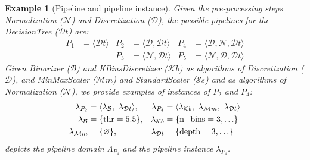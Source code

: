 \documentclass[5p,times]{elsarticle}
\newtheorem{example}{Example}
\begin{document}


\begin{example}[Pipeline and pipeline instance]
Given the pre-processing steps Normalization ($\mathcal{N}$) and Discretization ($\mathcal{D}$), the possible pipelines for the DecisionTree ($\mathcal{D}t$) are:
\begin{align*}
    P_1 &= \langle \mathcal{D}t \rangle &
    P_2 &= \langle \mathcal{D}, \mathcal{D}t \rangle & 
    P_4 &= \langle \mathcal{D}, \mathcal{N}, \mathcal{D}t \rangle \\
    &&
    P_3 &= \langle \mathcal{N}, \mathcal{D}t \rangle & P_5 &= \langle \mathcal{N}, \mathcal{D}, \mathcal{D}t \rangle
\end{align*}
Given \textup{Binarizer} ($\mathcal{B}$) and  \textup{KBinsDiscretizer} ($\mathcal{K}b$) as algorithms of Discretization ($\mathcal{D}$), and \textup{MinMaxScaler} ($\mathcal{M}m$) and \textup{StandardScaler} ($\mathcal{S}s$) and  as algorithms of Normalization ($\mathcal{N}$), we provide examples of instances of $P_2$ and $P_4$:
\begin{align*}
    \lambda_{P_2} &= \langle \lambda_{\mathcal{B}},~ \lambda_{\mathcal{D}t} \rangle, &\lambda_{P_4} &= \langle \lambda_{\mathcal{K}b},~ \lambda_{\mathcal{M}m},~ \lambda_{\mathcal{D}t} \rangle \\
    \lambda_{\mathcal{B}}&=\{ \textup{thr}=5.5 \}, &\lambda_{\mathcal{K}b}&=\{ \textup{n\_bins}=3, \ldots \}\\
    \lambda_{\mathcal{M}m}&=\{ \varnothing \}, &\lambda_{\mathcal{D}t}&= \{ \textup{depth}=3,\ldots\}
\end{align*}
 depicts the pipeline domain $\Lambda_{P_4}$ and the pipeline instance $\lambda_{P_4}$.
\label{ex:pipelineinstance}
\end{example}
\end{document}
